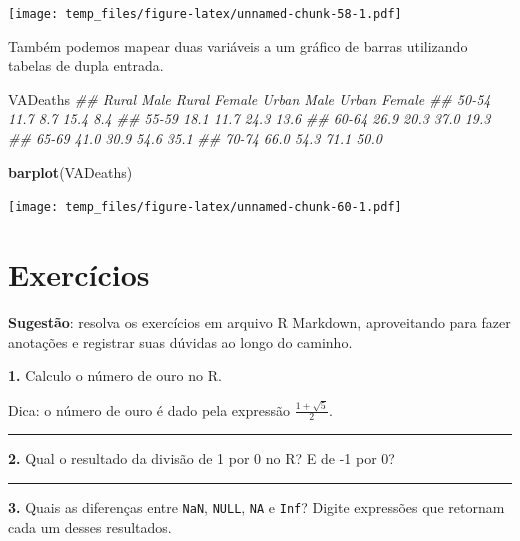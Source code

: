 \documentclass[]{book}
\newenvironment{Shaded}{\begin{snugshade}}{\end{snugshade}}
\newcommand{\CommentTok}[1]{\textcolor[rgb]{0.56,0.35,0.01}{\textit{#1}}}
\newcommand{\KeywordTok}[1]{\textcolor[rgb]{0.13,0.29,0.53}{\textbf{#1}}}
\newcommand{\NormalTok}[1]{#1}
\begin{document}
\texttt{[image: temp\_files/figure-latex/unnamed-chunk-58-1.pdf]}

Também podemos mapear duas variáveis a um gráfico de barras utilizando tabelas de dupla entrada.

\begin{Shaded}
\begin{Highlighting}[]
\NormalTok{VADeaths}
\CommentTok{##       Rural Male Rural Female Urban Male Urban Female}
\CommentTok{## 50-54       11.7          8.7       15.4          8.4}
\CommentTok{## 55-59       18.1         11.7       24.3         13.6}
\CommentTok{## 60-64       26.9         20.3       37.0         19.3}
\CommentTok{## 65-69       41.0         30.9       54.6         35.1}
\CommentTok{## 70-74       66.0         54.3       71.1         50.0}
\end{Highlighting}
\end{Shaded}

\begin{Shaded}
\begin{Highlighting}[]
\KeywordTok{barplot}\NormalTok{(VADeaths)}
\end{Highlighting}
\end{Shaded}

\texttt{[image: temp\_files/figure-latex/unnamed-chunk-60-1.pdf]}

\hypertarget{exercuxedcios}{%
\section{Exercícios}\label{exercuxedcios}}

\textbf{Sugestão}: resolva os exercícios em arquivo R Markdown, aproveitando para fazer anotações e registrar suas dúvidas ao longo do caminho.

\textbf{1.} Calculo o número de ouro no R.

Dica: o número de ouro é dado pela expressão \(\frac{1 + \sqrt{5}}{2}\).

\begin{center}\rule{0.5\linewidth}{\linethickness}\end{center}

\textbf{2.} Qual o resultado da divisão de 1 por 0 no R? E de -1 por 0?

\begin{center}\rule{0.5\linewidth}{\linethickness}\end{center}

\textbf{3.} Quais as diferenças entre \texttt{NaN}, \texttt{NULL}, \texttt{NA} e \texttt{Inf}? Digite expressões que retornam cada um desses resultados.
\end{document}
